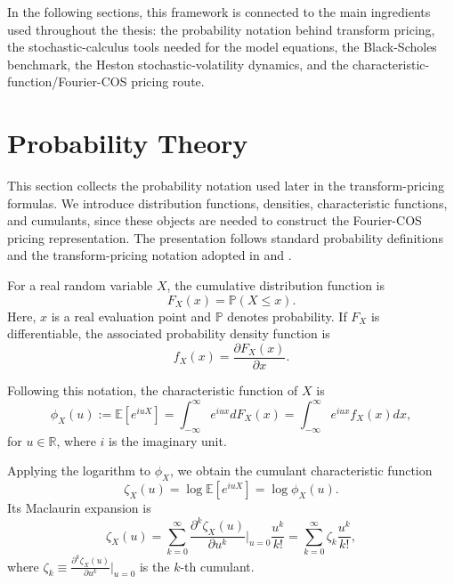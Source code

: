 In the following sections, this framework is connected to the main ingredients used throughout the thesis: the probability notation behind transform pricing, the stochastic-calculus tools needed for the model equations, the Black-Scholes benchmark, the Heston stochastic-volatility dynamics, and the characteristic-function/Fourier-COS pricing route.


\section{Probability Theory}
\label{sec:probability_theory_background}
This section collects the probability notation used later in the transform-pricing formulas. We introduce distribution functions, densities, characteristic functions, and cumulants, since these objects are needed to construct the Fourier-COS pricing representation. The presentation follows standard probability definitions and the transform-pricing notation adopted in \cite[Ch.~1]{oksendal2003} and \cite[Sec.~2]{fang_oosterlee_2009}.

For a real random variable $X$, the cumulative distribution function is
\begin{equation}
    F_X(x)=\mathbb P(X\le x).
\end{equation}
Here, $x$ is a real evaluation point and $\mathbb P$ denotes probability.
If $F_X$ is differentiable, the associated probability density function is
\begin{equation}
    f_X(x)=\frac{\partial F_X(x)}{\partial x}.
\end{equation}

Following this notation, the characteristic function of $X$ is
\begin{equation}
    \phi_X(u) :=\mathbb E\left[ e^{iuX} \right] = \int_{-\infty}^\infty e^{iux}dF_X(x) = \int_{-\infty}^\infty e^{iux}f_X(x)dx,
\end{equation}
\noindent for $u\in\mathbb R$, where $i$ is the imaginary unit.

Applying the logarithm to $\phi_X$, we obtain the cumulant characteristic function
\begin{equation}
    \zeta_X(u) = \log \mathbb E\left[e^{iuX}\right] = \log \phi_X(u).
\end{equation}
Its Maclaurin expansion is
\begin{equation}
    \zeta_X(u) = \sum_{k=0}^\infty \frac{\partial^k \zeta_X (u)}{\partial u^k}\bigg| _{u=0}\frac{u^k}{k!}=\sum_{k=0}^{\infty}\zeta_k \frac{u^k}{k!},
\end{equation}
where $\zeta_k \equiv\frac{\partial^k \zeta_X(u)}{\partial u^k}\bigg|_{u=0}$ is the $k$-th cumulant.


